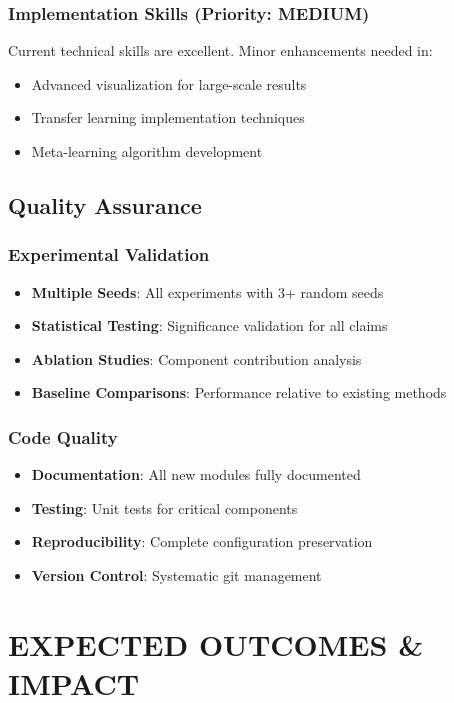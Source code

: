 \documentclass[11pt]{article}
\begin{document}
\subsubsection{Implementation Skills (Priority: MEDIUM)}
Current technical skills are excellent. Minor enhancements needed in:
\begin{itemize}
\item Advanced visualization for large-scale results
\item Transfer learning implementation techniques
\item Meta-learning algorithm development
\end{itemize}

\subsection{Quality Assurance}

\subsubsection{Experimental Validation}
\begin{itemize}
\item \textbf{Multiple Seeds}: All experiments with 3+ random seeds
\item \textbf{Statistical Testing}: Significance validation for all claims
\item \textbf{Ablation Studies}: Component contribution analysis
\item \textbf{Baseline Comparisons}: Performance relative to existing methods
\end{itemize}

\subsubsection{Code Quality}
\begin{itemize}
\item \textbf{Documentation}: All new modules fully documented
\item \textbf{Testing}: Unit tests for critical components
\item \textbf{Reproducibility}: Complete configuration preservation
\item \textbf{Version Control}: Systematic git management
\end{itemize}

\section{EXPECTED OUTCOMES \& IMPACT}
\end{document}
